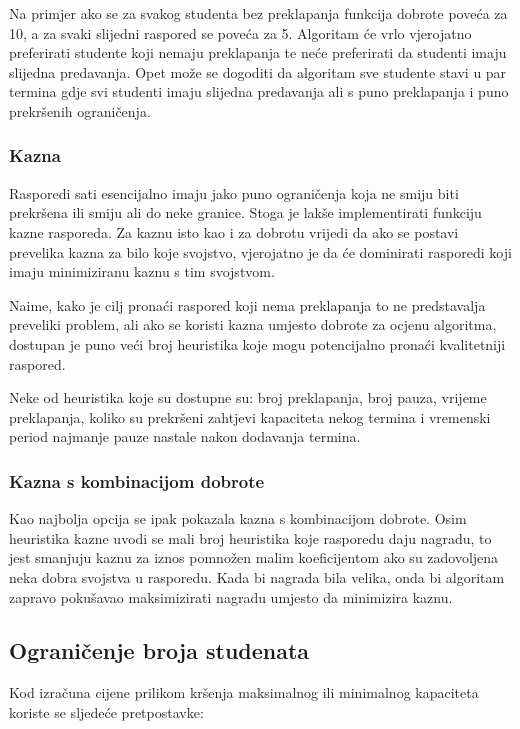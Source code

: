 \documentclass[times, utf8, zavrsni]{fer}
\begin{document}
Na primjer ako se za svakog studenta bez preklapanja funkcija dobrote poveća za 10, a za svaki slijedni raspored se poveća za 5. Algoritam će vrlo vjerojatno preferirati studente koji nemaju preklapanja te neće preferirati da studenti imaju slijedna predavanja. Opet može se dogoditi da algoritam sve studente stavi u par termina gdje svi studenti imaju slijedna predavanja ali s puno preklapanja i puno prekršenih ograničenja.

\subsubsection{Kazna}

Rasporedi sati esencijalno imaju jako puno ograničenja koja ne smiju biti prekršena ili smiju ali do neke granice. Stoga je lakše implementirati funkciju kazne rasporeda. Za kaznu isto kao i za dobrotu vrijedi da ako se postavi prevelika kazna za bilo koje svojstvo, vjerojatno je da će dominirati rasporedi koji imaju minimiziranu kaznu s tim svojstvom.

Naime, kako je cilj pronaći raspored koji nema preklapanja to ne predstavalja preveliki problem, ali ako se koristi kazna umjesto dobrote za ocjenu algoritma, dostupan je puno veći broj heuristika koje mogu potencijalno pronaći kvalitetniji raspored.

Neke od heuristika koje su dostupne su: broj preklapanja, broj pauza, vrijeme preklapanja, koliko su prekršeni zahtjevi kapaciteta nekog termina i vremenski period najmanje pauze nastale nakon dodavanja termina.

\subsubsection{Kazna s kombinacijom dobrote}
\label{sec:kombinacija}

Kao najbolja opcija se ipak pokazala kazna s kombinacijom dobrote. Osim heuristika kazne uvodi se mali broj heuristika koje rasporedu daju nagradu, to jest smanjuju kaznu za iznos pomnožen malim koeficijentom ako su zadovoljena neka dobra svojstva u rasporedu. Kada bi nagrada bila velika, onda bi algoritam zapravo pokušavao maksimizirati nagradu umjesto da minimizira kaznu.

\subsection{Ograničenje broja studenata}

Kod izračuna cijene prilikom kršenja maksimalnog ili minimalnog kapaciteta koriste se sljedeće pretpostavke:
\end{document}

